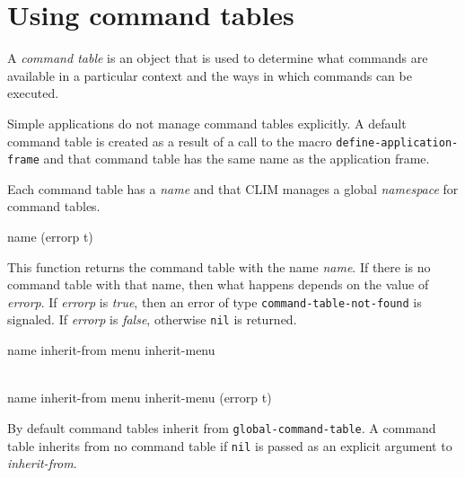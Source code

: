 \chapter{Using command tables}
\label{using-command-tables}

A \emph{command table} is an object that is used to determine what
commands are available in a particular context and the ways in which
commands can be executed.

Simple applications do not manage command tables explicitly.  A
default command table is created as a result of a call to the macro
\texttt{define-application-frame} and that command table has the same
name as the application frame.

Each command table has a \emph{name} and that CLIM manages a global
\emph{namespace} for command tables.

 {name \key (errorp t)}

This function returns the command table with the name \textit{name}.
If there is no command table with that name, then what happens depends
on the value of \textit{errorp}.  If \textit{errorp} is \emph{true},
then an error of type \texttt{command-table-not-found} is signaled. 
If \textit{errorp} is \emph{false}, otherwise \texttt{nil} is
returned.

 {name \key inherit-from menu
  inherit-menu}

 {\\name \key inherit-from menu
  inherit-menu (errorp t)}

By default command tables inherit from \texttt{global-command-table}. A
command table inherits from no command table if \texttt{nil} is passed as an
explicit argument to \textit{inherit-from}.
